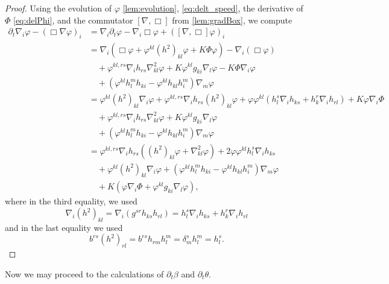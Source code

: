 \documentclass{amsart}
\begin{document}
\begin{proof}
Using the evolution of \(\varphi\) \cref{lem:evolution}, \cref{eq:delt_speed}, the derivative of \(\Phi\) \cref{eq:delPhi}, and the commutator \([\nabla, \Box]\) from \cref{lem:gradBox}, we compute
\[
\begin{split}
\partial_{t}\nabla_i \varphi - (\Box\nabla \varphi)_{i} &= \nabla_i \partial_t \varphi - \nabla_i \Box \varphi + ([\nabla, \Box] \varphi)_i \\
&= \nabla_i \left(\Box\varphi + \varphi^{kl}(h^2)_{kl}\varphi + K \Phi\varphi\right) - \nabla_i (\Box\varphi) \\
&\quad + \varphi^{kl,rs} \nabla_i h_{rs} \nabla^2_{kl} \varphi + K\varphi^{kl}g_{ki} \nabla_l \varphi - K\Phi\nabla_i \varphi \\
&\quad + (\varphi^{kl}h^{m}_{l}h_{ki} - \varphi^{kl}h_{kl}h^{m}_{i}) \nabla_m \varphi \\
&= \varphi^{kl}(h^2)_{kl}\nabla_i \varphi + \varphi^{kl,rs}\nabla_i h_{rs} (h^2)_{kl}\varphi + \varphi\varphi^{kl}(h^s_l \nabla_i h_{ks} + h^r_k \nabla_i h_{rl}) + K \varphi\nabla_i\Phi \\
&\quad + \varphi^{kl,rs} \nabla_i h_{rs} \nabla^2_{kl} \varphi + K\varphi^{kl}g_{ki}\nabla_l \varphi \\
&\quad + (\varphi^{kl}h^{m}_{l}h_{ki} - \varphi^{kl}h_{kl}h^{m}_{i}) \nabla_m \varphi \\
&= \varphi^{kl,rs}\nabla_i h_{rs} \left((h^2)_{kl}\varphi + \nabla^2_{kl} \varphi\right) + 2 \varphi\varphi^{kl} h^s_l \nabla_i h_{ks} \\
&\quad + \varphi^{kl}(h^2)_{kl}\nabla_i \varphi + (\varphi^{kl}h^{m}_{l}h_{ki} - \varphi^{kl}h_{kl}h^{m}_{i}) \nabla_m \varphi \\
&\quad + K \left(\varphi\nabla_i\Phi + \varphi^{kl}g_{ki}\nabla_l \varphi\right),
\end{split}
\]
where in the third equality, we used
\[
\nabla_i (h^2)_{kl} = \nabla_i (g^{sr} h_{ks} h_{rl}) = h^s_l \nabla_i h_{ks} + h^r_k \nabla_i h_{rl}
\]
and in the last equality we used
\[
b^{rs} (h^2)_{rl} = b^{rs} h_{rm} h^m_l = \delta^s_m h^m_l = h^s_l.
\]
\end{proof}
Now we may proceed to the calculations of \(\partial_t \beta\) and \(\partial_t \theta\).
\end{document}
